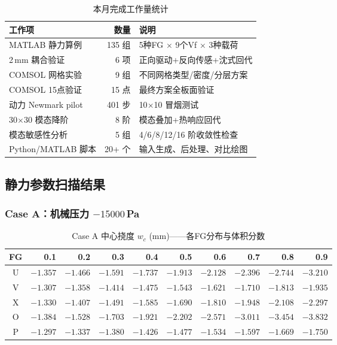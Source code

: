 \documentclass[12pt,a4paper]{ctexart}
\begin{document}
\begin{table}[H]
\centering
\caption{本月完成工作量统计}
\label{tab:workload}
\begin{tabular}{lrl}
\toprule
\textbf{工作项} & \textbf{数量} & \textbf{说明} \\
\midrule
MATLAB 静力算例 & 135 组 & 5种FG $\times$ 9个Vf $\times$ 3种载荷 \\
2\,mm 耦合验证 & 6 项 & 正向驱动+反向传感+沈式回代 \\
COMSOL 网格实验 & 9 组 & 不同网格类型/密度/分层方案 \\
COMSOL 15点验证 & 15 点 & 最终方案全板面验证 \\
动力 Newmark pilot & 401 步 & 10$\times$10 冒烟测试 \\
30$\times$30 模态降阶 & 8 阶 & 模态叠加+热响应回代 \\
模态敏感性分析 & 5 组 & 4/6/8/12/16 阶收敛性检查 \\
Python/MATLAB 脚本 & 20+ 个 & 输入生成、后处理、对比绘图 \\
\bottomrule
\end{tabular}
\end{table}

\subsection{静力参数扫描结果}

\subsubsection{Case A：机械压力 $-15000$\,Pa}

\begin{table}[H]
\centering
\caption{Case A 中心挠度 $w_c$ (mm)——各FG分布与体积分数}
\label{tab:elastic-results}
\small
\begin{tabular}{c*{9}{r}}
\toprule
\textbf{FG} & \textbf{0.1} & \textbf{0.2} & \textbf{0.3} & \textbf{0.4} & \textbf{0.5} & \textbf{0.6} & \textbf{0.7} & \textbf{0.8} & \textbf{0.9} \\
\midrule
U & $-1.357$ & $-1.466$ & $-1.591$ & $-1.737$ & $-1.913$ & $-2.128$ & $-2.396$ & $-2.744$ & $-3.210$ \\
V & $-1.307$ & $-1.358$ & $-1.414$ & $-1.475$ & $-1.543$ & $-1.621$ & $-1.710$ & $-1.813$ & $-1.935$ \\
X & $-1.330$ & $-1.407$ & $-1.491$ & $-1.585$ & $-1.690$ & $-1.810$ & $-1.948$ & $-2.108$ & $-2.297$ \\
O & $-1.384$ & $-1.528$ & $-1.703$ & $-1.921$ & $-2.202$ & $-2.571$ & $-3.011$ & $-3.454$ & $-3.832$ \\
P & $-1.297$ & $-1.337$ & $-1.380$ & $-1.426$ & $-1.477$ & $-1.534$ & $-1.597$ & $-1.669$ & $-1.750$ \\
\bottomrule
\end{tabular}
\end{table}
\end{document}
